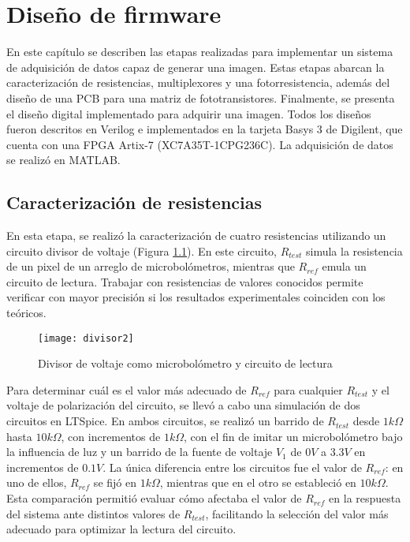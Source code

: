 \chapter{Diseño de firmware}
En este capítulo se describen las etapas realizadas para implementar un sistema de adquisición de datos capaz de generar una imagen. Estas etapas abarcan la caracterización de resistencias, multiplexores y una fotorresistencia, además del diseño de una PCB para una matriz de fototransistores. Finalmente, se presenta el diseño digital implementado para adquirir una imagen. Todos los diseños fueron descritos en Verilog e implementados en la tarjeta Basys 3 de Digilent, que cuenta con una FPGA Artix-7 (XC7A35T-1CPG236C). La adquisición de datos se realizó en MATLAB.

\section{Caracterización de resistencias}
En esta etapa, se realizó la caracterización de cuatro resistencias utilizando un circuito divisor de voltaje (Figura \ref{fig:divisor2}). En este circuito, $R_{test}$ simula la resistencia de un pixel de un arreglo de microbolómetros, mientras que $R_{ref}$ emula un circuito de lectura. Trabajar con resistencias de valores conocidos permite verificar con mayor precisión si los resultados experimentales coinciden con los teóricos. 


            \begin{figure}[hbtp]
                \centering
                \texttt{[image: divisor2]}
                \caption{Divisor de voltaje como microbolómetro y circuito de lectura}
                \label{fig:divisor2}
            \end{figure} 


Para determinar cuál es el valor más adecuado de $R_{ref}$ para cualquier $R_{test}$ y el voltaje de polarización del circuito, se llevó a cabo una simulación de dos circuitos en LTSpice. En ambos circuitos, se realizó un barrido de $R_{test}$ desde $1k\Omega$ hasta $10k\Omega$, con incrementos de $1k\Omega$, con el fin de imitar un microbolómetro bajo la influencia de luz y un barrido de la fuente de voltaje $V_{1}$ de $0V$ a $3.3V$ en incrementos de $0.1V$. La única diferencia entre los circuitos fue el valor de $R_{ref}$: en uno de ellos, $R_{ref}$ se fijó en $1k\Omega$, mientras que en el otro se estableció en $10k\Omega$. Esta comparación permitió evaluar cómo afectaba el valor de $R_{ref}$ en la respuesta del sistema ante distintos valores de $R_{test}$, facilitando la selección del valor más adecuado para optimizar la lectura del circuito.

